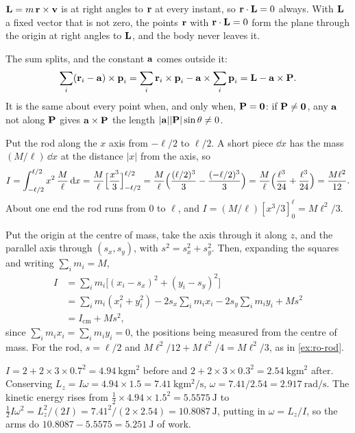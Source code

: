 $\bm{\mathrm{L}} = m\,\bm{\mathrm{r}}\times\bm{\mathrm{v}}$ is at right angles
to $\bm{\mathrm{r}}$ at every instant, so $\bm{\mathrm{r}}\cdot\bm{\mathrm{L}} = 0$ always. With
$\bm{\mathrm{L}}$ a fixed vector that is not zero, the points $\bm{\mathrm{r}}$ with $\bm{\mathrm{r}}
\cdot\bm{\mathrm{L}} = 0$ form the plane through the origin at right angles to
$\bm{\mathrm{L}}$, and the body never leaves it.

The sum splits, and the constant $\bm{\mathrm{a}}$ comes
outside it:
\begin{equation*}
   \sum_i(\bm{\mathrm{r}}_i - \bm{\mathrm{a}})\times\bm{\mathrm{p}}_i
   = \sum_i\bm{\mathrm{r}}_i\times\bm{\mathrm{p}}_i - \bm{\mathrm{a}}\times\sum_i\bm{\mathrm{p}}_i
   = \bm{\mathrm{L}} - \bm{\mathrm{a}}\times\bm{\mathrm{P}} .
\end{equation*}
It is the same about every point when, and only when, $\bm{\mathrm{P}} = \bm{\mathrm{0}}$:
if $\bm{\mathrm{P}} \neq \bm{\mathrm{0}}$, any $\bm{\mathrm{a}}$ not along $\bm{\mathrm{P}}$ gives $\bm{\mathrm{a}}
\times\bm{\mathrm{P}}$ the length $\lvert\bm{\mathrm{a}}\rvert\lvert\bm{\mathrm{P}}\rvert\sin\theta
\neq 0$.

Put the rod along the $x$ axis from $-\ell/2$ to
$\ell/2$. A short piece $\dd x$ has the mass $(M/\ell)\,\dd x$ at the
distance $\lvert x\rvert$ from the axis, so
\begin{equation*}
   I = \int_{-\ell/2}^{\ell/2} x^2\,\frac{M}{\ell}\,\mathrm{d} x
   = \frac{M}{\ell}\Bigl[\frac{x^3}{3}\Bigr]_{-\ell/2}^{\ell/2}
   = \frac{M}{\ell}\Bigl(\frac{(\ell/2)^3}{3} - \frac{(-\ell/2)^3}{3}\Bigr)
   = \frac{M}{\ell}\Bigl(\frac{\ell^3}{24} + \frac{\ell^3}{24}\Bigr)
   = \frac{M\ell^2}{12} .
\end{equation*}
About one end the rod runs from 0 to $\ell$, and $I = (M/\ell)[x^3/3]_0^\ell
= M\ell^2/3$.

Put the origin at the centre of mass, take the
axis through it along $z$, and the parallel axis through $(s_x, s_y)$, with $s^2 = s_x^2 +
s_y^2$. Then, expanding the squares and writing $\sum_i m_i = M$,
\begin{align*}
   I &= \sum_i m_i\bigl[(x_i - s_x)^2 + (y_i - s_y)^2\bigr]\\
   &= \sum_i m_i(x_i^2 + y_i^2) - 2s_x\sum_i m_ix_i - 2s_y\sum_i m_iy_i
      + Ms^2\\
   &= I_{\mathrm{cm}} + Ms^2 ,
\end{align*}
since $\sum_i m_ix_i = \sum_i m_iy_i = 0$, the positions being measured
from the centre of mass. For the rod, $s =
\ell/2$ and $M\ell^2/12 + M\ell^2/4 = M\ell^2/3$, as in \cref{ex:ro-rod}.

$I = 2 + 2\times3\times0.7^2 =
\SI{4.94}{\kilogram\metre\squared}$ before and $2 + 2\times3\times0.3^2 =
\SI{2.54}{\kilogram\metre\squared}$ after. Conserving $L_z = I\omega = 4.94\times1.5 =
\SI{7.41}{\kilogram\metre\squared\per\second}$, $\omega = 7.41/2.54 =
\SI{2.917}{\radian\per\second}$. The kinetic energy rises from
$\frac12\times4.94\times1.5^2 = \SI{5.5575}{\joule}$ to $\frac12 I\omega^2
= L_z^2/(2I) = 7.41^2/(2\times2.54) = \SI{10.8087}{\joule}$, putting in
$\omega = L_z/I$, so the arms do $10.8087 - 5.5575 = \SI{5.251}{\joule}$ of
work.

